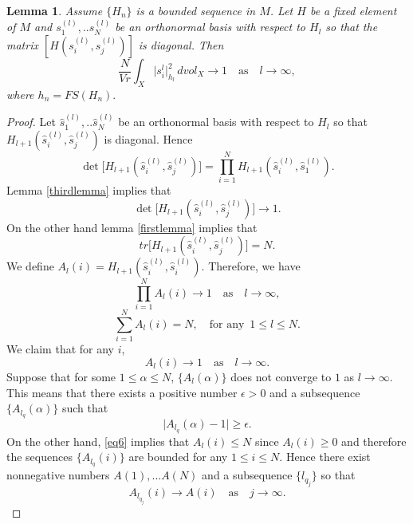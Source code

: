 \documentclass[12pt,oneside,notitlepage]{amsart}
\newtheorem{lem}[thm]{Lemma}
\theoremstyle{definition}
\theoremstyle{remark}
\numberwithin{equation}{section}
\begin{document}
\begin{lem}\label{fourthlemma}
Assume $\{H_{n}\}$ is a bounded sequence in $M$. Let $H$ be a
fixed element of $M$ and $s_{1}^{(l)},..s_{N}^{(l)}$ be an
orthonormal basis with respect to $H_{l}$ so that the matrix
$[H(s_{i}^{(l)},s_{j}^{(l)})]$ is diagonal.   Then
$$\frac{N}{Vr}\int_{X}\big|s_{i}^{l}\big|_{h_{l}}^2 \,
dvol_{X}\rightarrow 1  \,\,\,\, \textrm{    as }  \,\,\,\,
l\rightarrow\infty,$$ where $h_{n}=FS(H_{n}).$
\end{lem}

\begin{proof}

Let $\hat{s}_{1}^{(l)},..\hat{s}_{N}^{(l)}$ be an orthonormal
basis with respect to $H_{l}$ so that $H_{l+1}(\hat{s}_{i}^{(l)},
\hat{s}_{j}^{(l)} )$ is diagonal. Hence $$\det
\big[H_{l+1}(\hat{s}_{i}^{(l)}, \hat{s}_{j}^{(l)}
)\big]=\prod_{i=1}^{N}H_{l+1}(\hat{s}_{i}^{(l)}, \hat{s}_{1}^{(l)}
).$$ Lemma \ref{thirdlemma} implies that $$\det
\big[H_{l+1}(\hat{s}_{i}^{(l)}, \hat{s}_{j}^{(l)} )\big]
\rightarrow 1.$$ On the other hand lemma \ref{firstlemma} implies
that $$tr \big[ H_{l+1}(\hat{s}_{i}^{(l)},
\hat{s}_{j}^{(l)})\big]=N.$$ We define
$A_{l}(i)=H_{l+1}(\hat{s}_{i}^{(l)}, \hat{s}_{i}^{(l)}).$
Therefore, we have
\begin{equation}\label{eq5}\prod_{i=1}^{N}A_{l}(i)\rightarrow 1 \,\,\,\, \textrm{    as    }  \,\,\,\, l\rightarrow \infty , \end{equation}
\begin{equation}\label{eq6}\sum_{i=1}^{N} A_{l}(i)=N , \,\,\,\, \textrm{  for any } \, 1\leq l \leq N.\end{equation}
We claim that for any
$i$,\begin{equation}\label{eq7}A_{l}(i)\rightarrow 1 \,\,\,\,
\textrm{    as    }  \,\,\,\, l \rightarrow \infty.\end{equation}
Suppose that for some $1 \leq \alpha \leq N$, $\{A_{l}(\alpha) \}
$ does not converge to $1$ as $l \rightarrow \infty.$ This means
that there exists a positive number $\epsilon >0$ and a
subsequence $\{A_{l_{q}}(\alpha)\}$ such that
\begin{equation}\label{eq8}\big|A_{l_{q}}(\alpha)-1 \big| \geq \epsilon.\end{equation}
On the other hand, \eqref{eq6} implies that $A_{l}(i) \leq N$
since $A_{l}(i) \geq 0$ and therefore the sequences
$\{A_{l_{q}}(i)\}$ are bounded for any $1\leq i \leq N$. Hence
there exist nonnegative numbers $A(1),...A(N)$ and a subsequence
$\{ l_{q_{j}} \}$ so that
\begin{equation}\label{eq9}A_{l_{q_{j}}}(i) \rightarrow A(i) \,\,\,\, \textrm{    as    }  \,\,\,\, j\rightarrow \infty.\end{equation}

\end{proof}
\end{document}
